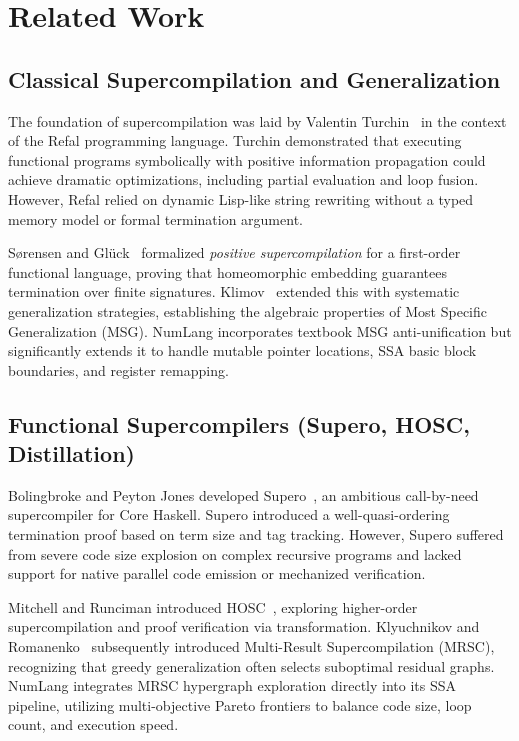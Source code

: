 \section{Related Work}
\label{sec:related}

\subsection{Classical Supercompilation and Generalization}
The foundation of supercompilation was laid by Valentin Turchin~\cite{turchin1986concept} in the context of the Refal programming language. Turchin demonstrated that executing functional programs symbolically with positive information propagation could achieve dramatic optimizations, including partial evaluation and loop fusion. However, Refal relied on dynamic Lisp-like string rewriting without a typed memory model or formal termination argument.

Sørensen and Glück~\cite{sorensen1995algorithm} formalized \textit{positive supercompilation} for a first-order functional language, proving that homeomorphic embedding guarantees termination over finite signatures. Klimov~\cite{klimov2008generalization} extended this with systematic generalization strategies, establishing the algebraic properties of Most Specific Generalization (MSG). NumLang incorporates textbook MSG anti-unification but significantly extends it to handle mutable pointer locations, SSA basic block boundaries, and register remapping.

\subsection{Functional Supercompilers (Supero, HOSC, Distillation)}
Bolingbroke and Peyton Jones developed Supero~\cite{bolingbroke2010supercompilation}, an ambitious call-by-need supercompiler for Core Haskell. Supero introduced a well-quasi-ordering termination proof based on term size and tag tracking. However, Supero suffered from severe code size explosion on complex recursive programs and lacked support for native parallel code emission or mechanized verification.

Mitchell and Runciman introduced HOSC~\cite{mitchell2010hosc,klyuchnikov2010hosc}, exploring higher-order supercompilation and proof verification via transformation. Klyuchnikov and Romanenko~\cite{klyuchnikov2012practical} subsequently introduced Multi-Result Supercompilation (MRSC), recognizing that greedy generalization often selects suboptimal residual graphs. NumLang integrates MRSC hypergraph exploration directly into its SSA pipeline, utilizing multi-objective Pareto frontiers to balance code size, loop count, and execution speed.

